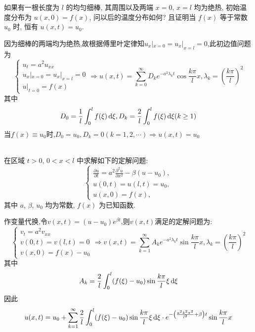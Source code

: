 \begin{exercise}[3]
  如果有一根长度为 $l$ 的均匀细棒, 其周围以及两端 $x=0$, $x=l$
  均为绝热, 初始温度分布为 $u(x,0)=f(x)$, 问以后的温度分布如何?
  且证明当 $f(x)$ 等于常数 $u_0$ 时, 恒有 $u(x,t)=u_0$.
\end{exercise}

\begin{solution}
  因为细棒的两端均为绝热,故根据傅里叶定律知$u_x|_{x=0}=u_x|_{x=l}=0$,此初边值问题为
  \[\begin{cases}
  u_t=a^2u_{xx}\\
  u_x|_{x=0}=u_x|_{x=l}=0\\
  u|_{t=0}=f(x)
  \end{cases}\Rightarrow u(x,t)=\sum_{k=0}^{\infty}D_ke^{-a^2\lambda_kt}\cos\frac{k\pi}{l}x,\lambda_k=\left(\frac{k\pi}{l}\right)^2\]
  其中\[D_0=\frac{1}{l}\int_0^lf(\xi)\mathop{}\!\mathrm{d}\xi,D_k=\frac{2}{l}\int_0^lf(\xi)\mathop{}\!\mathrm{d}\xi(k\geq1)\]
  当$f(x)\equiv u_0$时,$D_0=u_0,D_k=0(k=1,2,\cdots)\Rightarrow u(x,t)=u_0$\\\\
\end{solution}


\begin{exercise}
  在区域 $t>0$, $0<x<l$ 中求解如下的定解问题:
  \[\begin{cases}
    \frac{\partial u}{\partial t} = a^2 \frac{\partial^2u}{\partial x^2} - \beta(u-u_0), \\
    u(0,t) = u(l,t) = u_0, \\
    u(x,0) = f(x),
  \end{cases}\]
  其中 $a$, $\beta$, $u_0$ 均为常数, $f(x)$ 为已知函数.
\end{exercise}

\begin{solution}
  作变量代换,令$v(x,t)=(u-u_0)e^{\beta t}$,则$v(x,t)$满足的定解问题为:
  \[\begin{cases}
  v_t=a^2v_{xx}\\
  v(0,t)=v(l,t)=0\\
  v(x,0)=f(x)-u_0
  \end{cases}\Rightarrow v(x,t)=\sum_{k=1}^{\infty}A_ke^{-a^2\lambda_kt}\sin\frac{k\pi}{l}x,\lambda_k=\left(\frac{k\pi}{l}\right)^2\]
  其中\[A_k=\frac{2}{l}\int_0^l(f(\xi)-u_0)\sin\frac{k\pi}{l}\xi\mathop{}\!\mathrm{d}\xi\]
  因此\[u(x,t)=u_0+\sum_{k=1}^{\infty}\frac{2}{l}\int_0^l(f(\xi)-u_0)\sin\frac{k\pi}{l}\xi\mathop{}\!\mathrm{d}\xi\cdot e^{-\left(\frac{a^2k^2\pi^2}{l^2}+\beta\right)t}\sin\frac{k\pi}{l}x\]
\end{solution}


